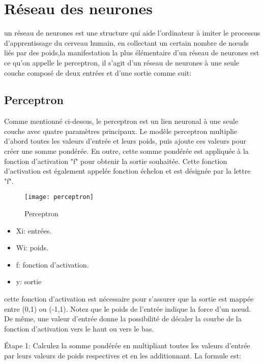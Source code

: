 \section{Réseau des neurones}
        un réseau de neurones est une structure qui aide l'ordinateur à imiter le processus d'apprentissage du cerveau humain, en collectant un certain nombre de nœuds liés par des poids,la manifestation la plus élémentaire d'un réseau de neurones est ce qu'on appelle le perceptron, il s'agit d'un réseau de neurones à une seule couche composé de deux entrées et d'une sortie comme suit:

        \subsection{Perceptron}
            Comme mentionné ci-dessus, le perceptron est  un lien neuronal à une seule couche avec quatre paramètres principaux. Le modèle perceptron multiplie d'abord toutes les valeurs d'entrée et leurs poids, puis ajoute ces valeurs pour créer une somme pondérée. En outre, cette somme pondérée est appliquée à la fonction d'activation "f" pour obtenir la sortie souhaitée. Cette fonction d'activation est également appelée fonction échelon et est désignée par la lettre "f".
            \begin{figure}[h]
                \centering
                \texttt{[image: perceptron]}
                \caption{Perceptron}
                \label{fig:perceptron}
            \end{figure}

            \begin{itemize}[label=$\bullet$]
                \item Xi: entrées.
                \item Wi: poids.
                \item f: fonction d'activation.
                \item y: sortie 
            \end{itemize}

            cette fonction d'activation est nécessaire pour s'assurer que la sortie est  mappée entre (0,1) ou (-1,1). Notez que le poids de l'entrée indique la force d'un nœud. De même, une valeur d'entrée donne la possibilité de décaler la courbe de la fonction d'activation vers le haut ou vers le bas.
            
            Étape 1: Calculez la somme pondérée en multipliant toutes les valeurs d'entrée par leurs valeurs de poids respectives et en les additionnant. La formule est:

